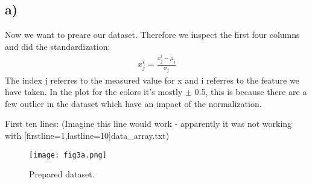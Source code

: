 \subsection{a)}
Now we want to preare our dataset. Therefore we inspect the first four columns and did the standardization:
\begin{align}
    x_j^{i} = \frac{x_j^{i} - \mu_j}{\sigma_j}
\end{align}
The index j referres to the measured value for x and i referres to the feature we have taken. In the plot for the colors it's mostly $\pm$ 0.5, this is because there are a few outlier in the dataset which have an impact of the normalization.

First ten lines:
%
(Imagine this line would work  - apparently it was not working with [firstline=1,lastline=10]{data_array.txt})

\begin{figure}[h!]
    \centering
    \texttt{[image: fig3a.png]}
    \caption{Prepared dataset.}
\end{figure}




